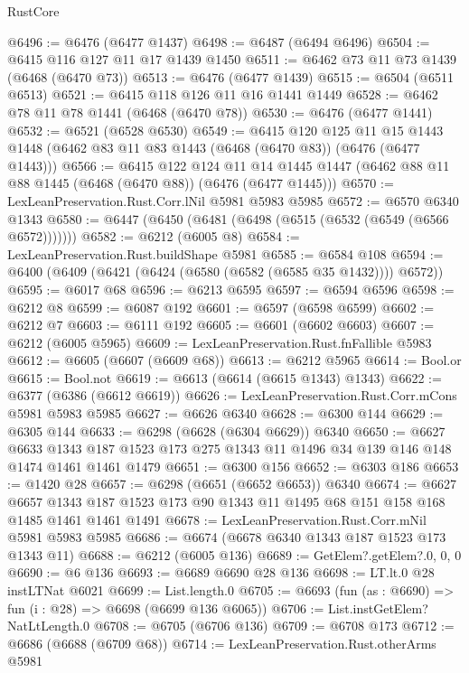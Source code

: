 \begin{lexlean}{RustCore}
\begin{coremodule}
{\begin{coremodule}
{{{{{{{{{{{{{{{{{{{{{{{{{{{{{{{{{{{{{{{{{{{{{{{@6496 := @6476 (@6477 @1437)
@6498 := @6487 (@6494 @6496)
@6504 := @6415 @116 @127 @11 @17 @1439 @1450
@6511 := @6462 @73 @11 @73 @1439 (@6468 (@6470 @73))
@6513 := @6476 (@6477 @1439)
@6515 := @6504 (@6511 @6513)
@6521 := @6415 @118 @126 @11 @16 @1441 @1449
@6528 := @6462 @78 @11 @78 @1441 (@6468 (@6470 @78))
@6530 := @6476 (@6477 @1441)
@6532 := @6521 (@6528 @6530)
@6549 := @6415
    @120
    @125
    @11
    @15
    @1443
    @1448
    (@6462 @83 @11 @83 @1443 (@6468 (@6470 @83)) (@6476 (@6477 @1443)))
@6566 := @6415
    @122
    @124
    @11
    @14
    @1445
    @1447
    (@6462 @88 @11 @88 @1445 (@6468 (@6470 @88)) (@6476 (@6477 @1445)))
@6570 := LexLeanPreservation.Rust.Corr.lNil @5981 @5983 @5985
@6572 := @6570 @6340 @1343
@6580 := @6447 (@6450 (@6481 (@6498 (@6515 (@6532 (@6549 (@6566 @6572)))))))
@6582 := @6212 (@6005 @8)
@6584 := LexLeanPreservation.Rust.buildShape @5981
@6585 := @6584 @108
@6594 := @6400 (@6409 (@6421 (@6424 (@6580 (@6582 (@6585 @35 @1432)))) @6572))
@6595 := @6017 @68
@6596 := @6213 @6595
@6597 := @6594 @6596
@6598 := @6212 @8
@6599 := @6087 @192
@6601 := @6597 (@6598 @6599)
@6602 := @6212 @7
@6603 := @6111 @192
@6605 := @6601 (@6602 @6603)
@6607 := @6212 (@6005 @5965)
@6609 := LexLeanPreservation.Rust.fnFallible @5983
@6612 := @6605 (@6607 (@6609 @68))
@6613 := @6212 @5965
@6614 := Bool.or
@6615 := Bool.not
@6619 := @6613 (@6614 (@6615 @1343) @1343)
@6622 := @6377 (@6386 (@6612 @6619))
@6626 := LexLeanPreservation.Rust.Corr.mCons @5981 @5983 @5985
@6627 := @6626 @6340
@6628 := @6300 @144
@6629 := @6305 @144
@6633 := @6298 (@6628 (@6304 @6629)) @6340
@6650 := @6627
    @6633
    @1343
    @187
    @1523
    @173
    @275
    @1343
    @11
    @1496
    @34
    @139
    @146
    @148
    @1474
    @1461
    @1461
    @1479
@6651 := @6300 @156
@6652 := @6303 @186
@6653 := @1420 @28
@6657 := @6298 (@6651 (@6652 @6653)) @6340
@6674 := @6627
    @6657
    @1343
    @187
    @1523
    @173
    @90
    @1343
    @11
    @1495
    @68
    @151
    @158
    @168
    @1485
    @1461
    @1461
    @1491
@6678 := LexLeanPreservation.Rust.Corr.mNil @5981 @5983 @5985
@6686 := @6674 (@6678 @6340 @1343 @187 @1523 @173 @1343 @11)
@6688 := @6212 (@6005 @136)
@6689 := GetElem?.getElem?.{0, 0, 0}
@6690 := @6 @136
@6693 := @6689 @6690 @28 @136
@6698 := LT.lt.{0} @28 instLTNat @6021
@6699 := List.length.{0}
@6705 := @6693 (fun (as : @6690) => fun (i : @28) => @6698 (@6699 @136 @6065))
@6706 := List.instGetElem?NatLtLength.{0}
@6708 := @6705 (@6706 @136)
@6709 := @6708 @173
@6712 := @6686 (@6688 (@6709 @68))
@6714 := LexLeanPreservation.Rust.otherArms @5981
}}}}}}}}}}}}}}}}}}}}}}}}}}}}}}}}}}}}}}}}}}}}}}}
\end{coremodule}}
\end{coremodule}
\end{lexlean}
